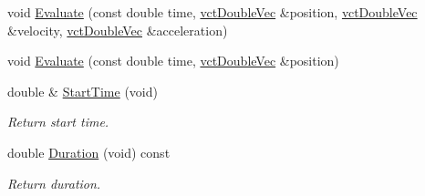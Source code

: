 \begin{DoxyCompactItemize}
void \hyperlink{classrob_l_s_p_b_a3d8541cca959dfe15cfb28a73cf71b77}{Evaluate} (const double time, \hyperlink{vct_dynamic_vector_types_8h_ade4b3068c86fb88f41af2e5187e491c2}{vct\+Double\+Vec} \&position, \hyperlink{vct_dynamic_vector_types_8h_ade4b3068c86fb88f41af2e5187e491c2}{vct\+Double\+Vec} \&velocity, \hyperlink{vct_dynamic_vector_types_8h_ade4b3068c86fb88f41af2e5187e491c2}{vct\+Double\+Vec} \&acceleration)
\item 
void \hyperlink{classrob_l_s_p_b_ab051b8339ff1cdd8f20bf9d596303266}{Evaluate} (const double time, \hyperlink{vct_dynamic_vector_types_8h_ade4b3068c86fb88f41af2e5187e491c2}{vct\+Double\+Vec} \&position)
\item 
double \& \hyperlink{classrob_l_s_p_b_abaf69e040bee6a191ad7e05ddc733ac9}{Start\+Time} (void)
\begin{DoxyCompactList}\small\item\em Return start time. \end{DoxyCompactList}\item 
double \hyperlink{classrob_l_s_p_b_a2977e4cd7d0148e294f7012ff2a58e89}{Duration} (void) const 
\begin{DoxyCompactList}\small\item\em Return duration. \end{DoxyCompactList}\end{DoxyCompactItemize}
